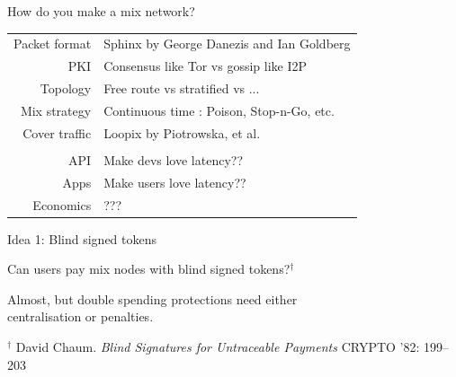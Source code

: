 \documentclass[fleqn,xcolor={usenames,dvipsnames},notes,aspectratio=169]{beamer} %
\begin{document}
\begin{frame}{How do you make a mix network?}
\begin{center}
\begin{tabular}{rl}
 Packet format &
  Sphinx by George Danezis and Ian Goldberg \smallskip \\ \smallskip
 PKI &
  Consensus like Tor vs gossip like I2P \\ \smallskip
 Topology &
  Free route vs stratified vs ... \\ \smallskip
 Mix strategy &
  Continuous time : Poison, Stop-n-Go, etc. \\ \smallskip
 Cover traffic & 
  Loopix by Piotrowska, et al. \\ \smallskip
 & \\ \smallskip
 API & Make devs love latency?? \\ \smallskip
 Apps & Make users love latency?? \\ \smallskip
 Economics & ??? \\
\end{tabular}
\end{center}
\end{frame}





\begin{frame}{Idea 1: Blind signed tokens}

Can users pay mix nodes with blind signed tokens?${}^\dag$

\bigskip

Almost, but double spending protections need either \\
\hspace*{3pt} centralisation or penalties.


\bigskip\bigskip\bigskip

${}^\dag$ David Chaum. {\em Blind Signatures for Untraceable Payments} CRYPTO '82: 199--203

\end{frame}
\end{document}
